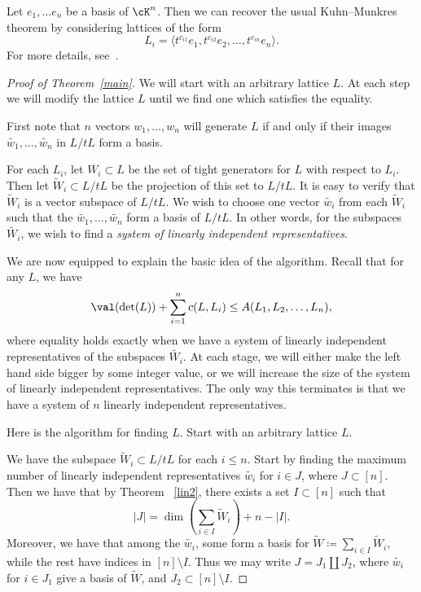 \begin{rema} Let $e_1, \dots e_n$ be a basis of $\cK^n$. Then we can recover the usual Kuhn--Munkres theorem by considering lattices of the form
\[
L_i = \langle t^{c_{i1}}e_1, t^{c_{i2}}e_2, \dots, t^{c_{in}}e_n\rangle .
\]
For more details, see~\cite{LO}.
\end{rema}



\begin{proof}[Proof of Theorem~\ref{main}] We will start with an arbitrary lattice $L$. At each step we will modify the lattice $L$ until we find one which satisfies the equality. 

First note that $n$ vectors $w_1, \dots, w_n$ will generate $L$ if and only if their images $\tilde{w_1}, \dots, \tilde{w_n}$ in $L/tL$ form a basis. 

For each $L_i$, let $W_i \subset L$ be the set of tight generators for $L$ with respect to $L_i$. Then let $\tilde{W}_i \subset L/tL$ be the projection of this set to $L/tL$. It is easy to verify that $\tilde{W}_i$ is a vector subspace of $L/tL$. We wish to choose one vector $\tilde{w_i}$ from each $\tilde{W}_i$ such that the $\tilde{w_1}, \dots, \tilde{w_n}$ form a basis of $L/tL$. In other words, for the subspaces $\tilde{W_i}$, we wish to find a \emph{system of linearly independent representatives}.

We are now equipped to explain the basic idea of the algorithm. Recall that for any $L$, we have
\[
\val(\det(L)) + \sum_{i=1}^n c(L,L_i) \leq A(L_1, L_2, \dots, L_n),
\]
where equality holds exactly when we have a system of linearly independent representatives of the subspaces $\tilde{W_i}$. At each stage, we will either make the left hand side bigger by some integer value, or we will increase the size of the system of linearly independent representatives. The only way this terminates is that we have a system of $n$ linearly independent representatives.

Here is the algorithm for finding $L$. Start with an arbitrary lattice $L$.

We have the subspace $\tilde{W}_i \subset L/tL$ for each $i \leq n$. Start by finding the maximum number of linearly independent representatives $\tilde{w_i}$ for $i \in J$, where $J \subset [n]$. Then we have that by Theorem ~\ref{lin2}, there exists a set $I \subset [n]$ such that 
\[
|J| = \dim \left( \sum_{i\in I} \tilde{W}_i \right) + n - |I|.
\]
Moreover, we have that among the $\tilde{w_i}$, some form a basis for $\tilde{W} \coloneqq  \sum_{i \in I} \tilde{W}_i$, while the rest have indices in $[n] \setminus I$. Thus we may write $J = J_1 \coprod J_2$, where $\tilde{w_i}$ for $i \in J_1$ give a basis of $\tilde{W}$, and $J_2 \subset [n] \setminus I.$


\end{proof}
